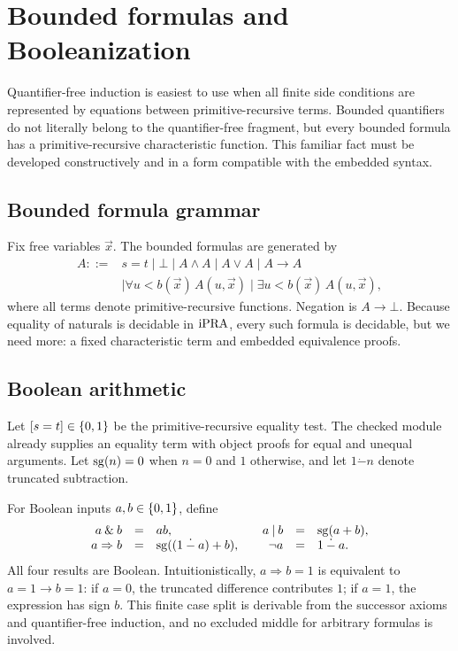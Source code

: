 \section{Bounded formulas and Booleanization}
\label{sec:booleanization}

Quantifier-free induction is easiest to use when all finite side conditions are
represented by equations between primitive-recursive terms.  Bounded quantifiers do
not literally belong to the quantifier-free fragment, but every bounded formula has a
primitive-recursive characteristic function.  This familiar fact must be developed
constructively and in a form compatible with the embedded syntax.

\subsection{Bounded formula grammar}

Fix free variables \(\vec x\).  The bounded formulas are generated by
\[
\begin{split}
 A ::= {}& s=t \mid \bot \mid A\wedge A \mid A\vee A \mid A\to A \\
         &\mid \forall u<b(\vec x)\,A(u,\vec x)
          \mid \exists u<b(\vec x)\,A(u,\vec x),
\end{split}
\]
where all terms denote primitive-recursive functions.  Negation is \(A\to\bot\).
Because equality of naturals is decidable in \(\mathrm{iPRA}\), every such formula is
decidable, but we need more: a fixed characteristic term and embedded equivalence
proofs.

\subsection{Boolean arithmetic}

Let \([s=t]\in\{0,1\}\) be the primitive-recursive equality test.  The checked
 module already supplies an equality term
 with object proofs for equal and unequal arguments.  Let
\(\operatorname{sg}(n)=0\) when \(n=0\) and \(1\) otherwise, and let
\(1\mathbin{\dot-}n\) denote truncated subtraction.

For Boolean inputs \(a,b\in\{0,1\}\), define
\[
\begin{array}{rclcrcl}
 a\mathbin{\&}b&=&ab, &&
 a\mathbin{|}b&=&\operatorname{sg}(a+b),\\
 a\Rightarrow b&=&\operatorname{sg}((1\mathbin{\dot-}a)+b),&&
 \neg a&=&1\mathbin{\dot-}a.
\end{array}
\]
All four results are Boolean.  Intuitionistically,
\(a\Rightarrow b=1\) is equivalent to \(a=1\to b=1\): if \(a=0\), the
truncated difference contributes \(1\); if \(a=1\), the expression has sign
\(b\).  This finite case split is derivable from the successor axioms and
quantifier-free induction, and no excluded middle for arbitrary formulas is involved.

